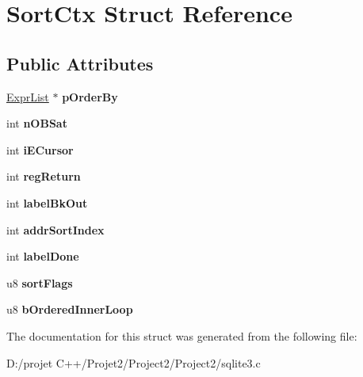 \hypertarget{struct_sort_ctx}{}\section{Sort\+Ctx Struct Reference}
\label{struct_sort_ctx}
\subsection*{Public Attributes}
\begin{DoxyCompactItemize}
\item 
\mbox{\label{struct_sort_ctx_a4c1f59510d6e08b38c958c358d31ba07}} 
\mbox{\hyperlink{struct_expr_list}{Expr\+List}} $\ast$ {\bfseries p\+Order\+By}
\item 
\mbox{\label{struct_sort_ctx_a32e424bbae6b3e56a0959738eaaaf1d2}} 
int {\bfseries n\+O\+B\+Sat}
\item 
\mbox{\label{struct_sort_ctx_acaf1633a51ccc836edd0594f90ed501b}} 
int {\bfseries i\+E\+Cursor}
\item 
\mbox{\label{struct_sort_ctx_a78017ace0acd29ba15652e389d9f90f6}} 
int {\bfseries reg\+Return}
\item 
\mbox{\label{struct_sort_ctx_abc19dcb503656023d5596aa31378e973}} 
int {\bfseries label\+Bk\+Out}
\item 
\mbox{\label{struct_sort_ctx_ad4c264de37b3f3b9bbff55e34659ef11}} 
int {\bfseries addr\+Sort\+Index}
\item 
\mbox{\label{struct_sort_ctx_a0f08fc3dd9df4320b3bb74461ca46759}} 
int {\bfseries label\+Done}
\item 
\mbox{\label{struct_sort_ctx_aca4654bd8cf3789c3a1b05d144e3ce2c}} 
u8 {\bfseries sort\+Flags}
\item 
\mbox{\label{struct_sort_ctx_a193c1104dbc3f5bfef3bd1f5ae1ada03}} 
u8 {\bfseries b\+Ordered\+Inner\+Loop}
\end{DoxyCompactItemize}


The documentation for this struct was generated from the following file\+:\begin{DoxyCompactItemize}
\item 
D\+:/projet C++/\+Projet2/\+Project2/\+Project2/sqlite3.\+c\end{DoxyCompactItemize}
